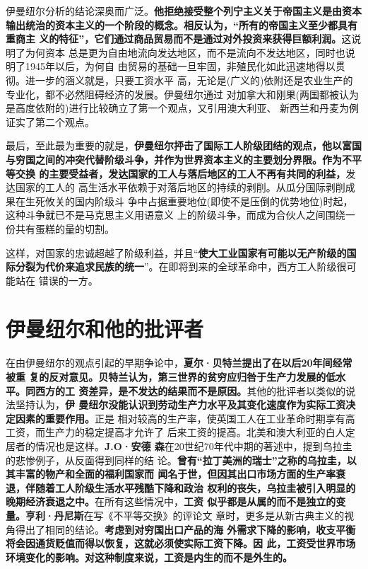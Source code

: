 伊曼纽尔分析的结论深奥而广泛。\textbf{他拒绝接受整个列宁主义关于帝国主义是由资本
  输出统治的资本主义的一个阶段的概念。相反认为，“所有的帝国主义至少都具有重商主
  义的特征”，它们通过商品贸易而不是通过对外投资来获得巨额利润。}这说明了为何资本
总是更为自由地流向发达地区，而不是流向不发达地区，同时也说明了1945年以后，为何自
由贸易的基础一旦牢固，非殖民化如此迅速地得以贯彻。进一步的涵义就是，只要工资水平
高，无论是(广义的)依附还是农业生产的专业化，都不必然阻碍经济的发展。伊曼纽尔通过
对加拿大和刚果(两国都被认为是高度依附的)进行比较确立了第一个观点，又引用澳大利亚、
新西兰和丹麦为例证实了第二个观点。

最后，至此最为重要的就是，\textbf{伊曼纽尔抨击了国际工人阶级团结的观点，他以富国
  与穷国之间的冲突代替阶级斗争，并作为世界资本主义的主要划分界限。作为不平等交换
  的主要受益者，发达国家的工人与落后地区的工人不再有共同的利益，}发达国家的工人的
高生活水平依赖于对落后地区的持续的剥削。从瓜分国际剥削成果在生死攸关的国内阶级斗
争中占据重要地位(即使不是压倒的优势地位)时起，这种斗争就已不是马克思主义用语意义
上的阶级斗争，而成为合伙人之间围绕一份共有蛋糕的量的切割。

这样，对国家的忠诚超越了阶级利益，并且“\textbf{使大工业国家有可能以无产阶级的国
  际分裂为代价来追求民族的统一}”。在即将到来的全球革命中，西方工人阶级很可能站在
错误的一方。


\section{伊曼纽尔和他的批评者}

在由伊曼纽尔的观点引起的早期争论中，\textbf{夏尔·贝特兰提出了在以后20年间经常被重
  复的反对意见。贝特兰认为，第三世界的贫穷应归咎于生产力发展的低水平。同西方的工
  资差异，是不发达的结果而不是原因。}其他的批评者以类似的说法坚持认为，\textbf{伊
  曼纽尔没能认识到劳动生产力水平及其变化速度作为实际工资决定因素的重要作用。}正是
相对较高的生产率，使英国工人在工业革命时期享有高工资，而生产力的稳定提高才允许了
后来工资的提高。北美和澳大利亚的白人定居者的情况也是这样。\textbf{J.O·安德
  森}在20世纪70年代中期的著述中，提到乌拉圭的悲惨例子，从反面得到同样的结
论。\textbf{曾有“拉丁美洲的瑞士”之称的乌拉圭，以其丰富的物产和全面的福利国家而
  闻名于世，但因其出口市场方面的生产率衰退，伴随着工人阶级生活水平残酷下降和政治
  权利的丧失，乌拉圭被引入明显的晚期经济衰退之中。}在所有这些情况中，\textbf{工资
  似乎都是从属的而不是独立的变量。}\textbf{亨利·丹尼斯}在写《不平等交换》的评论文
章时，更多是从新古典主义的视角得出了相同的结论。\textbf{考虑到对穷国出口产品的海
  外需求下降的影响，收支平衡将会因通货贬值而得以恢复，这就必须使实际工资下降。因
  此，工资受世界市场环境变化的影响。对这种制度来说，工资是内生的而不是外生的。}

